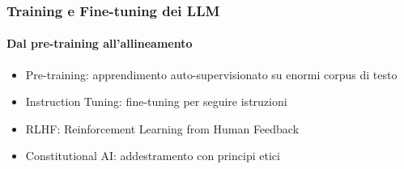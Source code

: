%
\begin{frame}[t,fragile] \frametitle{Training e Fine-tuning dei LLM}
	{\scriptsize
		\onslide<1->
            \framesubtitle{Dal pre-training all'allineamento}
            \vspace*{-10pt}
	    	\begin{minipage}[t]{\textwidth}
				\begin{minipage}[t]{0.6\textwidth}
	    			\begin{itemize}[leftmargin=10pt,align=right]
						\onslide<2->\item[\alert{\faHandORight}] \alert{Pre-training:} apprendimento auto-supervisionato su enormi corpus di testo
						\onslide<3->\item[\alert{\faHandORight}] \alert{Instruction Tuning:} fine-tuning per seguire istruzioni
						\onslide<4->\item[\alert{\faHandORight}] \alert{RLHF:} Reinforcement Learning from Human Feedback
						\onslide<5->\item[\alert{\faHandORight}] \alert{Constitutional AI:} addestramento con principi etici
					\end{itemize}
            	\end{minipage}
            	\begin{minipage}[t]{0.4\textwidth}
            	\end{minipage}
	    	\end{minipage}
	}
\end{frame}
%
